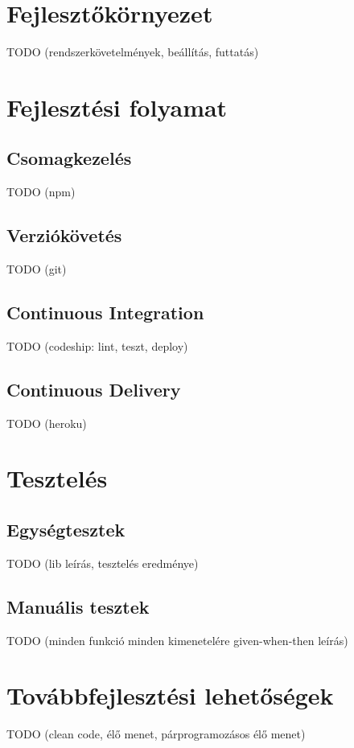 \documentclass{elteikthesis}
\begin{document}
		\section{Fejlesztőkörnyezet}
		TODO (rendszerkövetelmények, beállítás, futtatás)
		
		\section{Fejlesztési folyamat}

			\subsection{Csomagkezelés}
			TODO (npm)
			
			\subsection{Verziókövetés}
			TODO (git)
			
			\subsection{Continuous Integration}
			TODO (codeship: lint, teszt, deploy)
			
			\subsection{Continuous Delivery}
			TODO (heroku)
		
		\section{Tesztelés}

			\subsection{Egységtesztek}
			TODO (lib leírás, tesztelés eredménye)
			
			\subsection{Manuális tesztek}
			TODO (minden funkció minden kimenetelére given-when-then leírás)
		
		\section{Továbbfejlesztési lehetőségek}
		TODO (clean code, élő menet, párprogramozásos élő menet)
\end{document}
